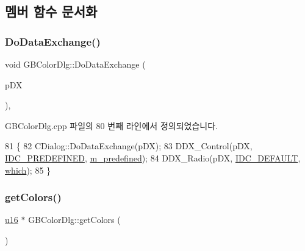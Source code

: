 \subsection{멤버 함수 문서화}
\mbox{\label{class_g_b_color_dlg_ab1cf7d47e5c9154f6ca742678242f861}} 
\subsubsection{\texorpdfstring{Do\+Data\+Exchange()}{DoDataExchange()}}
{\footnotesize\ttfamily void G\+B\+Color\+Dlg\+::\+Do\+Data\+Exchange (\begin{DoxyParamCaption}\item[{C\+Data\+Exchange $\ast$}]{p\+DX }\end{DoxyParamCaption})\hspace{0.3cm}{\ttfamily [protected]}, {\ttfamily [virtual]}}



G\+B\+Color\+Dlg.\+cpp 파일의 80 번째 라인에서 정의되었습니다.


\begin{DoxyCode}
81 \{
82     CDialog::DoDataExchange(pDX);
83     DDX\_Control(pDX, \mbox{\hyperlink{resource_8h_abb87a25253d4e207f521e7ce3d252da1}{IDC\_PREDEFINED}}, \mbox{\hyperlink{class_g_b_color_dlg_abd7ea64ca037d12cec0615ef7872c66b}{m\_predefined}});
84     DDX\_Radio(pDX, \mbox{\hyperlink{resource_8h_a7e071dc85b4dd3df18d253a7ac56646b}{IDC\_DEFAULT}}, \mbox{\hyperlink{class_g_b_color_dlg_a8f7bbf1c4a4ffe4a6c57454b9087ff28}{which}});
85 \}
\end{DoxyCode}
\mbox{\label{class_g_b_color_dlg_ab3fe3dff45003cb0483ad90eb42a3052}} 
\subsubsection{\texorpdfstring{get\+Colors()}{getColors()}}
{\footnotesize\ttfamily \mbox{\hyperlink{_system_8h_a9e6c91d77e24643b888dbd1a1a590054}{u16}} $\ast$ G\+B\+Color\+Dlg\+::get\+Colors (\begin{DoxyParamCaption}{ }\end{DoxyParamCaption})}



